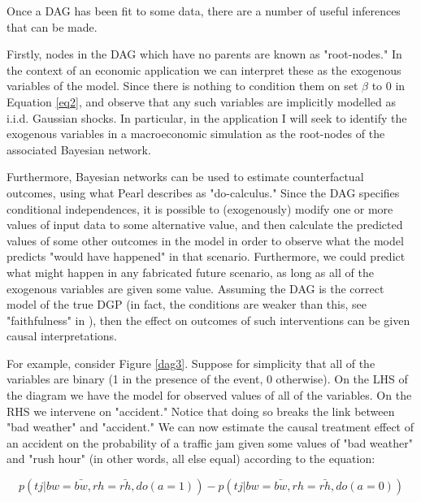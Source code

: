\documentclass{article}
\begin{document}
Once a DAG has been fit to some data, there are a number of useful inferences that can be made. 

Firstly, nodes in the DAG which have no parents are known as "root-nodes." In the context of an economic application we can interpret these as the exogenous variables of the model. Since there is nothing to condition them on set $\beta$ to 0 in Equation \ref{eq2}, and observe that any such variables are implicitly modelled as i.i.d. Gaussian shocks. In particular, in the application I will seek to identify the exogenous variables in a macroeconomic simulation as the root-nodes of the associated Bayesian network.

Furthermore, Bayesian networks can be used to estimate counterfactual outcomes, using what Pearl \parencite{pearl2009causality} describes as "do-calculus." Since the DAG specifies conditional independences, it is possible to (exogenously) modify one or more values of input data to some alternative value, and then calculate the predicted values of some other outcomes in the model in order to observe what the model predicts "would have happened" in that scenario. Furthermore, we could predict what might happen in any fabricated future scenario, as long as all of the exogenous variables are given some value. Assuming the DAG is the correct model of the true DGP (in fact, the conditions are weaker than this, see "faithfulness" in \parencite{pearl2009causality}), then the effect on outcomes of such interventions can be given causal interpretations. 

For example, consider Figure \ref{dag3}. Suppose for simplicity that all of the variables are binary (1 in the presence of the event, 0 otherwise). On the LHS of the diagram we have the model for observed values of all of the variables. On the RHS we intervene on "accident." Notice that doing so breaks the link between "bad weather" and "accident." We can now estimate the causal treatment effect of an accident on the probability of a traffic jam given some values of "bad weather" and "rush hour" (in other words, all else equal) according to the equation:

\begin{equation}
  \label{eq3}
  p(tj | bw = \bar{bw}, rh = \bar{rh}, do(a=1)) - p(tj | bw = \bar{bw}, rh = \bar{rh}, do(a=0))
\end{equation}
\end{document}
